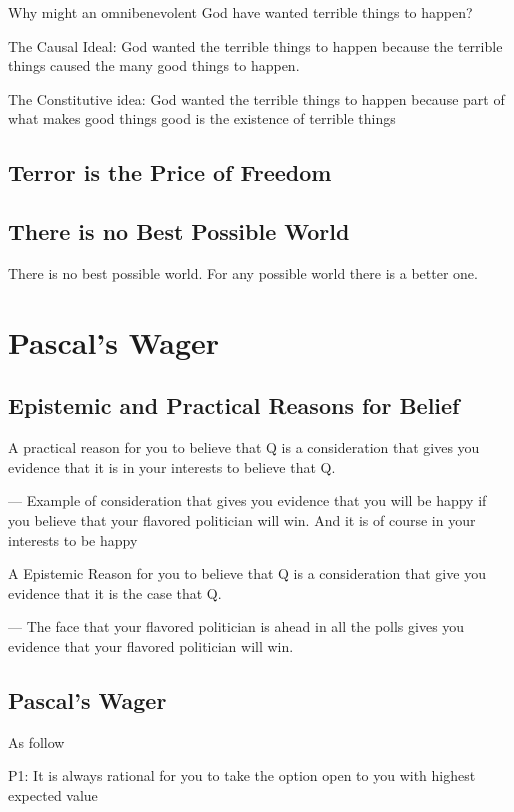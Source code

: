 \documentclass{article}
\begin{document}
Why might an omnibenevolent God have wanted terrible things to happen?

The Causal Ideal: God wanted the terrible things to happen because the terrible things caused the many good things to happen.

The Constitutive idea: God wanted the terrible things to happen because part of what makes good things good is the existence of terrible things

\subsection{Terror is the Price of Freedom}

\subsection{There is no Best Possible World}

There is no best possible world. For any possible world there is a better one.

\section{Pascal's Wager}
\subsection{Epistemic and Practical Reasons for Belief}

A practical reason for you to believe that Q is a consideration that gives you evidence that it is in your interests to believe that Q.

--- Example of consideration that gives you evidence that you will be happy if you believe that your flavored politician will win. And it is of course in your interests to be happy

A Epistemic Reason for you to believe that Q is a consideration that give you evidence that it is the case that Q.

--- The face that your flavored politician is ahead in all the polls gives you evidence that your flavored politician will win.

\subsection{Pascal's Wager}

As follow

P1: It is always rational for you to take the option open to you with highest expected value
\end{document}

